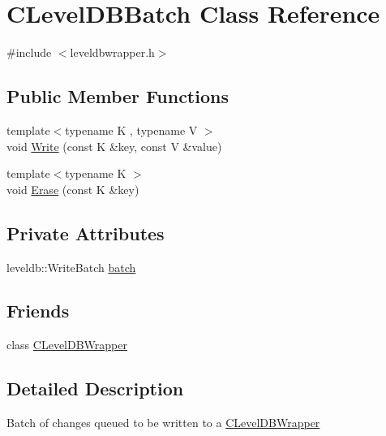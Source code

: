 \hypertarget{class_c_level_d_b_batch}{}\section{C\+Level\+D\+B\+Batch Class Reference}
\label{class_c_level_d_b_batch}


{\ttfamily \#include $<$leveldbwrapper.\+h$>$}

\subsection*{Public Member Functions}
\begin{DoxyCompactItemize}
\item 
{\footnotesize template$<$typename K , typename V $>$ }\\void \mbox{\hyperlink{class_c_level_d_b_batch_ab459da1abafa27e834de9a4cc25b6f2d}{Write}} (const K \&key, const V \&value)
\item 
{\footnotesize template$<$typename K $>$ }\\void \mbox{\hyperlink{class_c_level_d_b_batch_a22bf093d560b4ce3333e8f4a947faa7f}{Erase}} (const K \&key)
\end{DoxyCompactItemize}
\subsection*{Private Attributes}
\begin{DoxyCompactItemize}
\item 
leveldb\+::\+Write\+Batch \mbox{\hyperlink{class_c_level_d_b_batch_af404cb1abfb4d62781eb6d22d408cd5d}{batch}}
\end{DoxyCompactItemize}
\subsection*{Friends}
\begin{DoxyCompactItemize}
\item 
class \mbox{\hyperlink{class_c_level_d_b_batch_acbe5e6be88c5bccb0ec229ebc91dde82}{C\+Level\+D\+B\+Wrapper}}
\end{DoxyCompactItemize}


\subsection{Detailed Description}
Batch of changes queued to be written to a \mbox{\hyperlink{class_c_level_d_b_wrapper}{C\+Level\+D\+B\+Wrapper}} 

